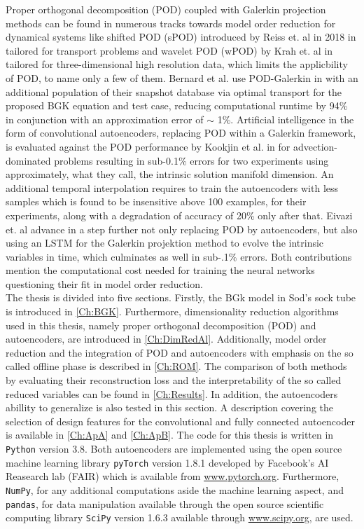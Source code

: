 Proper orthogonal decomposition (POD) coupled with Galerkin projection methods can be found in numerous tracks towards model order reduction for dynamical systems like shifted POD (sPOD) introduced by Reiss et. al in 2018 in \cite{reiss2018shifted} tailored for transport problems and wavelet POD (wPOD) by Krah et. al in \cite{krah2020wavelet}  tailored for three-dimensional high resolution data, which limits the applicbility of POD, to name only a few of them. Bernard et al. use POD-Galerkin  in \cite{Bernard} with an additional population of their snapshot database via optimal transport for the proposed BGK equation and test case, reducing computational runtime by 94\% in conjunction with an approximation error of \(\sim\) 1\%. Artificial intelligence in the form of convolutional autoencoders, replacing POD within a Galerkin framework, is evaluated against the POD performance by Kookjin et al. in \cite{Carlberg} for advection-dominated problems resulting in sub-0.1\% errors for two experiments using approximately, what they call, the intrinsic solution manifold dimension. An additional temporal interpolation requires to train the autoencoders with less samples which is found to be insensitive above 100 examples, for their experiments, along with a degradation of accuracy of 20\% only after that. Eivazi et. al advance in \cite{eivazi2021recurrent} a step further not only replacing POD by autoencoders, but also using an LSTM for the Galerkin projektion method to evolve the intrinsic variables in time, which culminates as well in sub-.1\% errors. Both contributions mention the computational cost needed for training the neural networks questioning their fit in model order reduction.\\ 

The thesis is divided into five sections. Firstly, the BGk model in Sod's sock tube is introduced in \cref{Ch:BGK}. Furthermore, dimensionality reduction algorithms used in this thesis, namely proper orthogonal decomposition (POD) and autoencoders, are introduced in \cref{Ch:DimRedAl}. Additionally, model order reduction and the integration of POD and autoencoders with emphasis on the so called offline phase is described in \cref{Ch:ROM}. The comparison of both methods by evaluating their reconstruction loss and the interpretability of the so called reduced variables can be found in \cref{Ch:Results}. In addition, the autoencoders abillity to generalize is also tested in this section. A description covering the selection of design features for the convolutional and fully connected autoencoder is available in \cref{Ch:ApA} and \cref{Ch:ApB}. The code for this thesis is written in \texttt{Python} version 3.8. Both autoencoders are implemented using the open source machine learning library \texttt{pyTorch} version 1.8.1 developed by Facebook's AI Reasearch lab (FAIR) which is available from \url{www.pytorch.org}. Furthermore, \texttt{NumPy}, for any additional computations aside the machine learning aspect, and \texttt{pandas}, for data manipulation available through the open source scientific computing library \texttt{SciPy} version 1.6.3 available through \url{www.scipy.org}, are used.\\  
